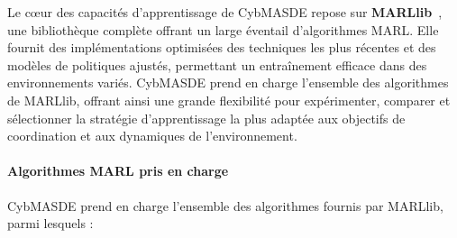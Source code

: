 \documentclass[pdflatex,sn-mathphys-num]{sn-jnl}%
\theoremstyle{thmstyleone}%
\theoremstyle{thmstyletwo}%
\theoremstyle{thmstylethree}%
\begin{document}
Le cœur des capacités d'apprentissage de CybMASDE repose sur \textbf{MARLlib}~\cite{hu2022marllib}, une bibliothèque complète offrant un large éventail d'algorithmes MARL. Elle fournit des implémentations optimisées des techniques les plus récentes et des modèles de politiques ajustés, permettant un entraînement efficace dans des environnements variés. CybMASDE prend en charge l'ensemble des algorithmes de MARLlib, offrant ainsi une grande flexibilité pour expérimenter, comparer et sélectionner la stratégie d'apprentissage la plus adaptée aux objectifs de coordination et aux dynamiques de l'environnement.

\paragraph{Algorithmes MARL pris en charge}
CybMASDE prend en charge l'ensemble des algorithmes fournis par MARLlib, parmi lesquels :
\end{document}
